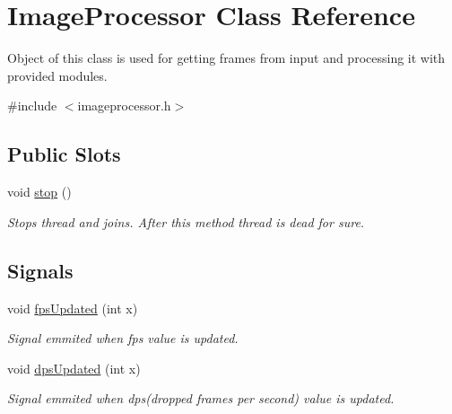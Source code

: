 \hypertarget{class_image_processor}{
\section{ImageProcessor Class Reference}
\label{de/d7d/class_image_processor}
}


Object of this class is used for getting frames from input and processing it with provided modules.  




{\ttfamily \#include $<$imageprocessor.h$>$}

\subsection*{Public Slots}
\begin{DoxyCompactItemize}
\item 
\hypertarget{class_image_processor_a9759fb0e904d60f127ce864ce89422ff}{
void \hyperlink{class_image_processor_a9759fb0e904d60f127ce864ce89422ff}{stop} ()}
\label{de/d7d/class_image_processor_a9759fb0e904d60f127ce864ce89422ff}

\begin{DoxyCompactList}\small\item\em Stops thread and joins. After this method thread is dead for sure. \item\end{DoxyCompactList}\end{DoxyCompactItemize}
\subsection*{Signals}
\begin{DoxyCompactItemize}
\item 
void \hyperlink{class_image_processor_ab46ee54f524c921c1f986f52520c0335}{fpsUpdated} (int x)
\begin{DoxyCompactList}\small\item\em Signal emmited when fps value is updated. \item\end{DoxyCompactList}\item 
void \hyperlink{class_image_processor_a7901548b6088dc05c969a7541efdf1dd}{dpsUpdated} (int x)
\begin{DoxyCompactList}\small\item\em Signal emmited when dps(dropped frames per second) value is updated. \item\end{DoxyCompactList}\end{DoxyCompactItemize}
